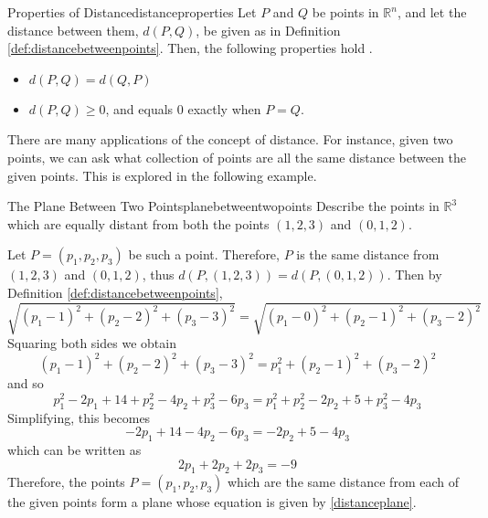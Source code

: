 \begin{theorem}{Properties of Distance}{distanceproperties}
Let $P$ and $Q$ be points in $\mathbb{R}^n$, and let the distance between them,
$d( P, Q)$, be given as in Definition \ref{def:distancebetweenpoints}. 
Then, the following properties hold .
\begin{itemize}
\item $ d( P, Q) = d( Q, P)  $
\item $ d( P, Q) \geq 0$, and equals 0 exactly when $P = Q.$
\end{itemize}
\end{theorem}

There are many applications of the concept of distance. For instance,
given two points, we can ask what collection of points are all the
same distance between the given points. This is explored in the
following example.

\begin{example}{The Plane Between Two Points}{planebetweentwopoints}
Describe the points in $\mathbb{R}^3$ which are equally distant from both the points $\left(
1,2,3\right) $ and $\left( 0,1,2\right) .$
\end{example}

\begin{solution}
Let $P = \left( p_1 , p_2, p_3\right) $ be such a point. Therefore, $P$ is the same distance from $\left(
1,2,3\right) $ and $\left( 0,1,2\right) $, thus $d(P,(1,2,3))=d(P,(0,1,2))$.
Then by Definition \ref{def:distancebetweenpoints},
\begin{equation*}
\sqrt{\left( p_1 -1\right) ^{2}+\left( p_2 -2\right) ^{2}+\left( p_3-3\right) ^{2}}=
\sqrt{\left( p_1 - 0 \right)^{2}+\left( p_2-1\right) ^{2}+\left( p_3-2\right) ^{2}}
\end{equation*}
Squaring both sides we obtain 
\begin{equation*}
\left( p_1 -1\right) ^{2}+\left( p_2 -2\right) ^{2}+\left( p_3 -3\right)
^{2}=p_1^{2}+\left( p_2-1\right) ^{2}+\left( p_3 -2\right) ^{2}
\end{equation*}
and so
\begin{equation*}
\allowbreak p_1^{2}-2p_1+14+p_2^{2}-4p_2+p_3^{2}-6p_3=p_1^{2}+p_2^{2}-2p_2+5+p_3^{2}-4p_3
\end{equation*}
Simplifying, this becomes
\begin{equation*}
-2p_1+14-4p_2-6p_3=-2p_2+5-4p_3
\end{equation*}
which can be written as 
\begin{equation}
2p_1+2p_2+2p_3=-9  \label{distanceplane}
\end{equation}
Therefore, the points $P = \left(
p_1,p_2,p_3\right) $  which are the same 
distance from each of the given points form a plane whose equation is given by \ref{distanceplane}.
\end{solution}

